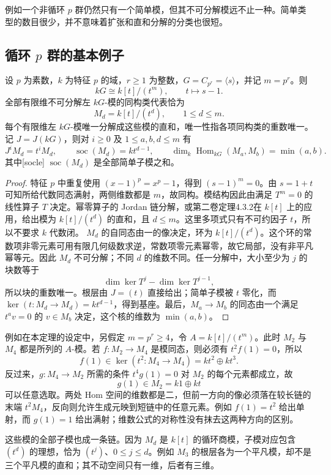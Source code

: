 \ProseParagraphBreak
例如一个非循环 \(p\) 群仍然只有一个简单模，但其不可分解模远不止一种。简单类型的数目很少，并不意味着扩张和直和分解的分类也很短。

\subsection{\texorpdfstring{循环 \(p\) 群的基本例子}{循环 p 群的基本例子}}
\label{b5:subsec:0801:03}

\begin{theorem}\label{b5:thm:cyclic-p-modules}
	设 \(p\) 为素数，\(k\) 为特征 \(p\) 的域，\(r\ge1\) 为整数，\(G=C_{p^r}=\langle s\rangle\)，并记 \(m=p^r\)。则
	\[
		kG\cong k[t]/(t^m),\qquad t\longmapsto s-1.
	\]
	全部有限维不可分解左 \(kG\)-模的同构类代表恰为
	\[
		M_d=k[t]/(t^d),\qquad 1\le d\le m.
	\]
	每个有限维左 \(kG\)-模唯一分解成这些模的直和，唯一性指各项同构类的重数唯一。记 \(J=J(kG)\)，则对 \(i\ge0\) 及 \(1\le a,b,d\le m\) 有
	\[
		J^iM_d=t^iM_d,\qquad \operatorname{soc}(M_d)=kt^{d-1},\qquad \dim_k\operatorname{Hom}_{kG}(M_a,M_b)=\min(a,b).
	\]
	其中[socle] \(\operatorname{soc}(M_d)\) 是全部简单子模之和。
\end{theorem}
\begin{proof}
	特征 \(p\) 中重复使用 \((x-1)^p=x^p-1\)，得到 \((s-1)^m=0\)。由 \(s=1+t\) 可知所给代数同态满射，两侧维数都是 \(m\)，故同构。模结构因此由满足 \(T^m=0\) 的线性算子 \(T\) 决定。幂零算子的 Jordan 链分解，或第二卷定理4.3.2在 \(k[t]\) 上的应用，给出模为 \(k[t]/(t^d)\) 的直和，且 \(d\le m\)。这里多项式只有不可约因子 \(t\)，所以不要求 \(k\) 代数闭。 \(M_d\) 的自同态由一的像决定，环为 \(k[t]/(t^d)\)。这个环的常数项非零元素可用有限几何级数求逆，常数项零元素幂零，故它局部，没有非平凡幂等元。因此 \(M_d\) 不可分解；不同 \(d\) 的维数不同。任一分解中，大小至少为 \(j\) 的块数等于
	\[
		\dim\ker T^j-\dim\ker T^{j-1},
	\]
	所以块的重数唯一。根层由 \(J=(t)\) 直接给出；简单子模被 \(t\) 零化，而 \(\ker(t:M_d\to M_d)=kt^{d-1}\)，得到基座。最后，\(M_a\to M_b\) 的同态由一个满足 \(t^a v=0\) 的 \(v\in M_b\) 决定，这个核的维数为 \(\min(a,b)\)。
\end{proof}
例如在本定理的设定中，另假定 \(m=p^r\ge4\)，令 \(A=k[t]/(t^m)\)。此时 \(M_2\) 与 \(M_4\) 都是所列的 \(A\)-模。若 \(f:M_2\to M_4\) 是模同态，则必须有 \(t^2f(1)=0\)，所以
\[
	f(1)\in\ker(t^2:M_4\to M_4)=kt^2\oplus kt^3.
\]
反过来，\(g:M_4\to M_2\) 所需的条件 \(t^4g(1)=0\) 对 \(M_2\) 的每个元素都成立，故
\[
	g(1)\in M_2=k1\oplus kt
\]
可以任意选取。两处 Hom 空间的维数都是二，但前一方向的像必须落在较长链的末端 \(t^2M_4\)，反向则允许生成元映到短链中的任意元素。例如 \(f(1)=t^2\) 给出单射，而 \(g(1)=1\) 给出满射；维数公式的对称性没有抹去这两种方向的区别。

\ProseParagraphBreak
这些模的全部子模也成一条链。因为 \(M_d\) 是 \(k[t]\) 的循环商模，子模对应包含 \((t^d)\) 的理想，恰为 \((t^j)\)、\(0\le j\le d\)。例如 \(M_3\) 的根层各为一个平凡模，却不是三个平凡模的直和；其不动空间只有一维，后者有三维。
